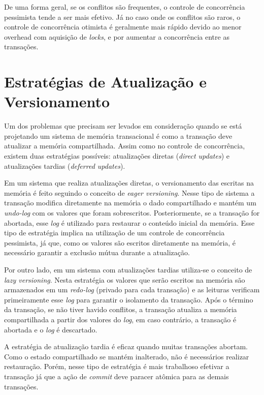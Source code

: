 De uma forma geral, se os conflitos são frequentes, o controle de concorrência pessimista tende a ser mais efetivo. Já no caso onde os conflitos são raros, o controle de concorrência otimista é geralmente mais rápido devido ao menor overhead com aquisição de \emph{locks}, e por aumentar a concorrência entre as transações.


\section{Estratégias de Atualização e Versionamento}

Um dos problemas que precisam ser levados em consideração quando se está projetando um sistema de memória transacional é como a transação deve atualizar a memória compartilhada. Assim como no controle de concorrência, existem duas estratégias possíveis: atualizações diretas (\emph{direct updates}) e atualizações tardias (\emph{deferred updates}). \cite{herzeel2009reusable}

Em um sistema que realiza atualizações diretas, o versionamento das escritas na memória é feito seguindo o conceito de \emph{eager versioning}. Nesse tipo de sistema a transação modifica diretamente na memória o dado compartilhado e mantém um \emph{undo-log} com os valores que foram sobrescritos. Posteriormente, se a transação for abortada, esse \emph{log} é utilizado para restaurar o conteúdo inicial da memória. Esse tipo de estratégia implica na utilização de um controle de concorrência pessimista, já que, como os valores são escritos diretamente na memória, é necessário garantir a exclusão mútua durante a atualização.

Por outro lado, em um sistema com atualizações tardias utiliza-se o conceito de \emph{lazy versioning}. Nesta estratégia os valores que serão escritos na memória são armazenados em um \emph{redo-log} (privado para cada transação) e as leituras verificam primeiramente esse \emph{log} para garantir o isolamento da transação. Após o término da transação, se não tiver havido conflitos, a transação atualiza a memória compartilhada a partir dos valores do \emph{log}, em caso contrário, a transação é abortada e o \emph{log} é descartado. 

A estratégia de atualização tardia é eficaz quando muitas transações abortam. Como o estado compartilhado se mantém inalterado, não é necessários realizar restauração. Porém, nesse tipo de estratégia é mais trabalhoso efetivar a transação já que a ação de \emph{commit} deve paracer atômica para as demais transações.


